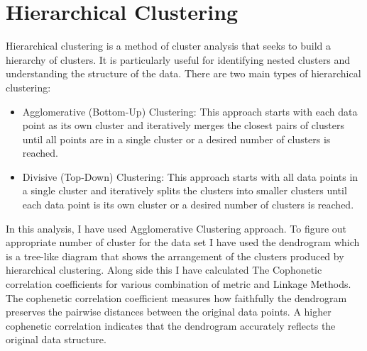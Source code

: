 \documentclass[10pt,a4paper]{style}
\begin{document}
	\clearpage	
	\newpage
	\section{Hierarchical Clustering}
		Hierarchical clustering is a method of cluster analysis that seeks to build a hierarchy of clusters. It is particularly useful for identifying nested clusters and understanding the structure of the data. There are two main types of hierarchical clustering: 
		\begin{itemize}
			\item Agglomerative (Bottom-Up) Clustering: This approach starts with each data point as its own cluster and iteratively merges the closest pairs of clusters until all points are in a single cluster or a desired number of clusters is reached.
			\item Divisive (Top-Down) Clustering: This approach starts with all data points in a single cluster and iteratively splits the clusters into smaller clusters until each data point is its own cluster or a desired number of clusters is reached.
		\end{itemize}
		
		In this analysis, I have used Agglomerative Clustering approach. To figure out appropriate number of cluster for the data set I have used the dendrogram which is a tree-like diagram that shows the arrangement of the clusters produced by hierarchical clustering. Along side this I have calculated The Cophonetic correlation coefficients for various combination of metric and Linkage Methods. The cophenetic correlation coefficient measures how faithfully the dendrogram preserves the pairwise distances between the original data points. A higher cophenetic correlation indicates that the dendrogram accurately reflects the original data structure.
	
\end{document}
